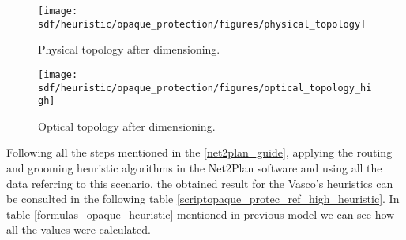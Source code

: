 \begin{figure}[H]
\centering
\texttt{[image: sdf/heuristic/opaque\_protection/figures/physical\_topology]}
\caption{Physical topology after dimensioning.}
\label{physical_topology_protec_ref_high_heuristic}
\end{figure}

\begin{figure}[H]
\centering
\texttt{[image: sdf/heuristic/opaque\_protection/figures/optical\_topology\_high]}
\caption{Optical topology after dimensioning.}
\label{optical_topology_protec_ref_high_heuristic}
\end{figure}

Following all the steps mentioned in the \ref{net2plan_guide}, applying the routing and grooming heuristic algorithms in the Net2Plan software and using all the data referring to this scenario, the obtained result for the Vasco's heuristics can be consulted in the following table \ref{scriptopaque_protec_ref_high_heuristic}. In table \ref{formulas_opaque_heuristic} mentioned in previous model we can see how all the values were calculated. \\

